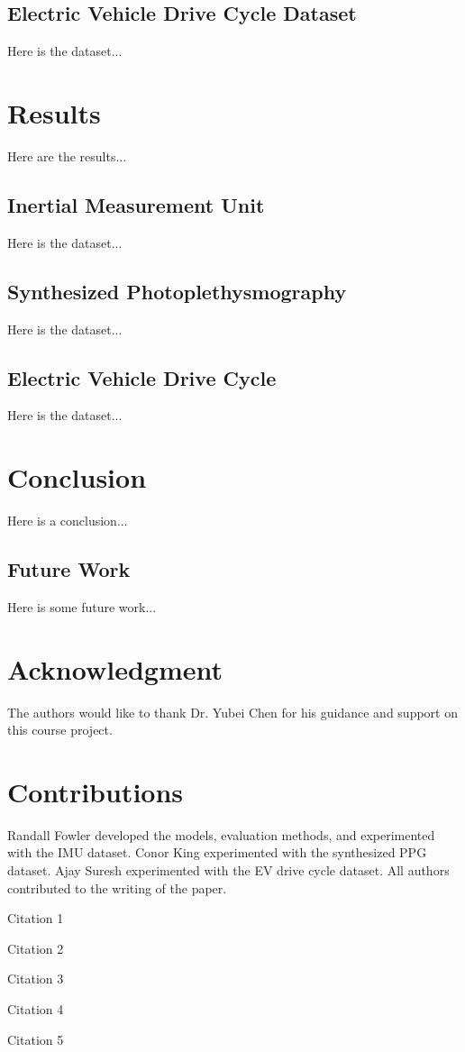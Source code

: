 \documentclass[conference]{IEEEtran}
\begin{document}
\subsection{Electric Vehicle Drive Cycle Dataset}
Here is the dataset...


\section{Results}
Here are the results...

\subsection{Inertial Measurement Unit}
Here is the dataset...

\subsection{Synthesized Photoplethysmography}
Here is the dataset...

\subsection{Electric Vehicle Drive Cycle}
Here is the dataset...


\section{Conclusion}%
Here is a conclusion...

\subsection{Future Work}
Here is some future work...

\section*{Acknowledgment}
The authors would like to thank Dr. Yubei Chen for his guidance and support on this course project.

\section*{Contributions}
Randall Fowler developed the models, evaluation methods, and experimented with the IMU dataset. 
Conor King experimented with the synthesized PPG dataset. 
Ajay Suresh experimented with the EV drive cycle dataset. 
All authors contributed to the writing of the paper.

\begin{thebibliography}{1}


Citation 1

Citation 2

Citation 3

Citation 4

Citation 5

\end{thebibliography}
\end{document}
